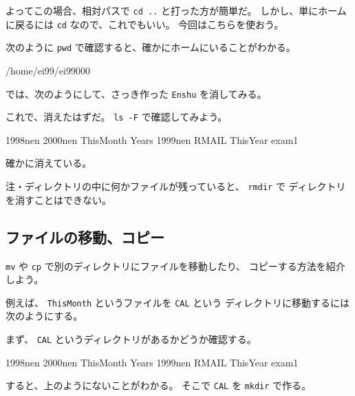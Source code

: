 よってこの場合、相対パスで \texttt{cd ..} と打った方が簡単だ。
しかし、単にホームに戻るには \texttt{cd} なので、これでもいい。
今回はこちらを使おう。

\begin{progls}
%
\end{progls}

次のように \texttt{pwd} で確認すると、確かにホームにいることがわかる。

\begin{progls}
/home/ei99/ei99000
%
\end{progls}

では、次のようにして、さっき作った \texttt{Enshu} を消してみる。

\begin{progls}
%
\end{progls}

これで、消えたはずだ。
\texttt{ls -F} で確認してみよう。

\begin{progls}
1998nen         2000nen         ThisMonth       Years
1999nen         RMAIL           ThisYear        exam1
%
\end{progls}

確かに消えている。

\bigskip

注・ディレクトリの中に何かファイルが残っていると、 \texttt{rmdir} で
ディレクトリを消すことはできない。

\subsection{ファイルの移動、コピー}

\texttt{mv} や \texttt{cp} で別のディレクトリにファイルを移動したり、
コピーする方法を紹介しよう。

例えば、 \texttt{ThisMonth} というファイルを \texttt{CAL} という
ディレクトリに移動するには次のようにする。

まず、 \texttt{CAL} というディレクトリがあるかどうか確認する。

\begin{progls}
1998nen         2000nen         ThisMonth       Years
1999nen         RMAIL           ThisYear        exam1
%
\end{progls}

すると、上のようにないことがわかる。
そこで \texttt{CAL} を \texttt{mkdir} で作る。

\begin{progls}
%
\end{progls}

